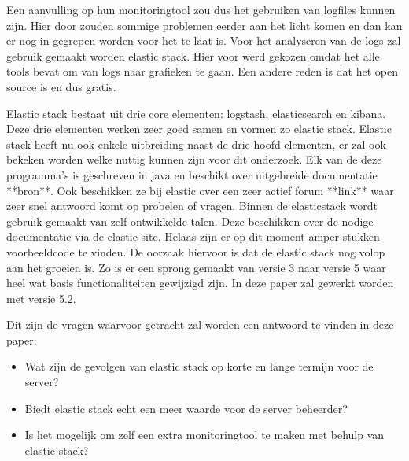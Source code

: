 Een aanvulling op hun monitoringtool zou dus het gebruiken van logfiles kunnen zijn. Hier door zouden sommige problemen eerder aan het licht komen en dan kan er nog in gegrepen worden voor het te laat is. Voor het analyseren van de logs zal gebruik gemaakt worden elastic stack. Hier voor werd gekozen omdat het alle tools bevat om van logs naar grafieken te gaan. Een andere reden is dat het open source is en dus gratis. 


Elastic stack bestaat uit drie core elementen: logstash, elasticsearch en kibana.
Deze drie elementen werken zeer goed samen en vormen zo elastic stack. Elastic stack heeft nu ook enkele uitbreiding naast de drie hoofd elementen, er zal ook bekeken worden welke nuttig kunnen zijn voor dit onderzoek.
Elk van de deze programma's is geschreven in java en beschikt over uitgebreide documentatie **bron**. Ook beschikken ze bij elastic over een zeer actief forum **link** waar zeer snel antwoord komt op probelen of vragen. Binnen de elasticstack wordt gebruik gemaakt van zelf ontwikkelde talen. Deze beschikken over de nodige documentatie via de elastic site. Helaas zijn er op dit moment amper stukken voorbeeldcode te vinden.
De oorzaak hiervoor is dat de elastic stack nog volop aan het groeien is. Zo is er een sprong gemaakt van versie 3 naar versie 5 waar heel wat basis functionaliteiten gewijzigd zijn. In deze paper zal gewerkt worden met versie 5.2.

Dit zijn de vragen waarvoor getracht zal worden een antwoord te vinden in deze paper:

\begin{itemize}
  \item Wat zijn de gevolgen van elastic stack op korte en lange termijn voor de server?
  \item Biedt elastic stack echt een meer waarde voor de server beheerder?
  \item Is het mogelijk om zelf een extra monitoringtool te maken met behulp van elastic stack?
\end{itemize}

